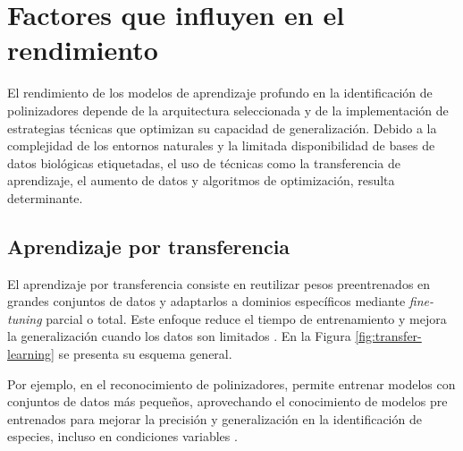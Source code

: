 \vspace{-1.0cm}
\section{Factores que influyen en el rendimiento}

El rendimiento de los modelos de aprendizaje profundo en la identificación de
polinizadores depende de la arquitectura seleccionada y de la implementación de estrategias técnicas que optimizan su capacidad de generalización. Debido a la complejidad de los entornos naturales y la limitada disponibilidad de bases de
datos biológicas etiquetadas, el uso de técnicas como la transferencia de aprendizaje, el aumento de datos y algoritmos de optimización, resulta determinante.

\subsection{Aprendizaje por transferencia}

El aprendizaje por transferencia consiste en reutilizar pesos preentrenados en grandes conjuntos de datos y adaptarlos a dominios específicos mediante \textit{fine-tuning} parcial o total. Este enfoque reduce el tiempo de entrenamiento y mejora la generalización cuando los datos son limitados \parencite{Burri2023,Jagtap2025,Zheng2021}. En la Figura \ref{fig:transfer-learning} se presenta su esquema general. 

Por ejemplo, en el reconocimiento de polinizadores, permite entrenar modelos con conjuntos de datos más pequeños, aprovechando el conocimiento de modelos pre entrenados para mejorar la precisión y generalización en la identificación de especies, incluso en condiciones variables \parencite{minervini2021bearing}. \\

